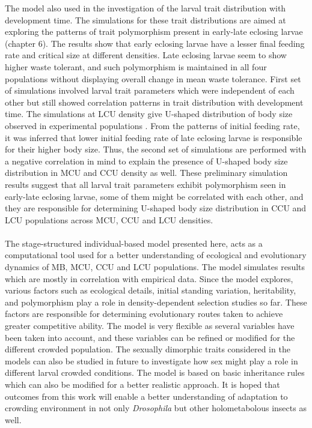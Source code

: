 The model also used in the investigation of the larval trait distribution with development time. The simulations for these trait distributions are aimed at exploring the patterns of trait polymorphism present in early-late eclosing larvae (chapter 6). The results show that early eclosing larvae have a lesser final feeding rate and critical size at different densities. Late eclosing larvae seem to show higher waste tolerant, and such polymorphism is maintained in all four populations without displaying overall change in mean waste tolerance. First set of simulations involved larval trait parameters which were independent of each other but still showed correlation patterns in trait distribution with development time. The simulations at LCU density give U-shaped distribution of body size observed in experimental populations \citep{sarangiEcologicalDetailsMediate2018}. From the patterns of initial feeding rate, it was inferred that lower initial feeding rate of late eclosing larvae is responsible for their higher body size. Thus, the second set of simulations are performed with a negative correlation in mind to explain the presence of U-shaped body size distribution in MCU and CCU density as well. These preliminary simulation results suggest that all larval trait parameters exhibit polymorphism seen in early-late eclosing larvae, some of them might be correlated with each other, and they are responsible for determining U-shaped body size distribution in CCU and LCU populations across MCU, CCU and LCU densities.\\\\
The stage-structured individual-based model presented here, acts as a computational tool used for a better understanding of ecological and evolutionary dynamics of MB, MCU, CCU and LCU populations. The model simulates results which are mostly in correlation with empirical data. Since the model explores, various factors such as ecological details, initial standing variation, heritability, and polymorphism play a role in density-dependent selection studies so far. These factors are responsible for determining evolutionary routes taken to achieve greater competitive ability. The model is very flexible as several variables have been taken into account, and these variables can be refined or modified for the different crowded population. The sexually dimorphic traits considered in the models can also be studied in future to investigate how sex might play a role in different larval crowded conditions. The model is based on basic inheritance rules which can also be modified for a better realistic approach. It is hoped that outcomes from this work will enable a better understanding of adaptation to crowding environment in not only \textit{Drosophila} but other holometabolous insects as well.
\pagebreak

